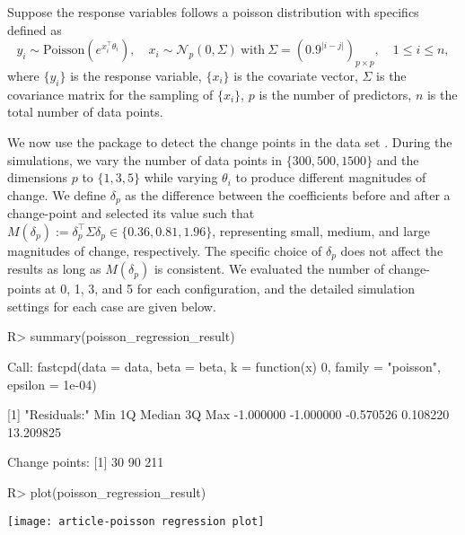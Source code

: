 \documentclass[article]{jss}
\begin{document}
Suppose the response variables follows a poisson distribution with specifics
defined as
%
\begin{equation} \label{eq:logistic_regression}
y_i \sim \mathrm{Poisson}\left(e^{x_i^\top \theta_i}\right),
\quad x_i \sim \mathcal{N}_p(0, \Sigma)\ \mathrm{with}\ \Sigma =
(0.9^{\lvert i - j \rvert})_{p \times p}, \quad 1 \le i \le n,
\end{equation}
%
where $\{y_i\}$ is the response variable, $\{x_i\}$ is the covariate vector,
$\Sigma$ is the covariance matrix for the sampling of $\{x_i\}$, $p$ is the
number of predictors, $n$ is the total number of data points.

We now use the  package to detect the change points in the data set
. During the simulations, we vary the number of data points in
$\{300, 500, 1500\}$ and the dimensions $p$ to $\{1, 3, 5\}$ while varying $\theta_i$
to produce different magnitudes of change. We define $\delta_p$ as the difference
between the coefficients before and after a change-point and selected its value
such that $M(\delta_p):=\delta_p^\top \Sigma \delta_p \in \{0.36, 0.81, 1.96\}$,
representing small, medium, and large magnitudes of change, respectively. The
specific choice of $\delta_p$ does not affect the results as long as $M(\delta_p)$
is consistent. We evaluated the number of change-points at 0, 1, 3, and 5 for
each configuration, and the detailed simulation settings for each case are given
below.
%
%

\begin{Schunk}
\begin{Sinput}
R> summary(poisson_regression_result)
\end{Sinput}
\begin{Soutput}
Call:
fastcpd(data = data, beta = beta, k = function(x) 0, family = "poisson", 
    epsilon = 1e-04)

[1] "Residuals:"
      Min        1Q    Median        3Q       Max 
-1.000000 -1.000000 -0.570526  0.108220 13.209825 

Change points:
[1]  30  90 211
\end{Soutput}
\begin{Sinput}
R> plot(poisson_regression_result)
\end{Sinput}
\end{Schunk}
\texttt{[image: article-poisson regression plot]}
\end{document}
